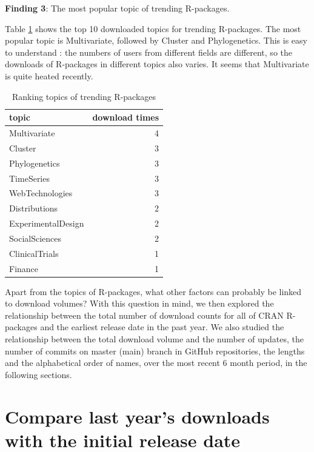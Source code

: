 \documentclass[
]{book}
\newenvironment{discovery}[1]{%
  \begin{tcolorbox}[colback=blue!30,colframe=blue!80!black]#1}{\end{tcolorbox}}
\begin{document}
\begin{discovery}
\textbf{Finding 3}: The most popular topic of trending R-packages.
\end{discovery}

Table \ref{tab:trending-count} shows the top 10 downloaded topics for trending R-packages. The most popular topic is Multivariate, followed by Cluster and Phylogenetics. This is easy to understand : the numbers of users from different fields are different, so the downloads of R-packages in different topics also varies. It seems that Multivariate is quite heated recently.

\begin{table}

\caption{\label{tab:trending-count}Ranking topics of trending R-packages}
\centering
\begin{tabular}[t]{l|r}
\hline
topic & download times\\
\hline
Multivariate & 4\\
\hline
Cluster & 3\\
\hline
Phylogenetics & 3\\
\hline
TimeSeries & 3\\
\hline
WebTechnologies & 3\\
\hline
Distributions & 2\\
\hline
ExperimentalDesign & 2\\
\hline
SocialSciences & 2\\
\hline
ClinicalTrials & 1\\
\hline
Finance & 1\\
\hline
\end{tabular}
\end{table}

Apart from the topics of R-packages, what other factors can probably be linked to download volumes? With this question in mind, we then explored the relationship between the total number of download counts for all of CRAN R-packages and the earliest release date in the past year. We also studied the relationship between the total download volume and the number of updates, the number of commits on master (main) branch in GitHub repositories, the lengths and the alphabetical order of names, over the most recent 6 month period, in the following sections.

\hypertarget{compare-last-years-downloads-with-the-initial-release-date}{%
\section{Compare last year's downloads with the initial release date}\label{compare-last-years-downloads-with-the-initial-release-date}}
\end{document}
